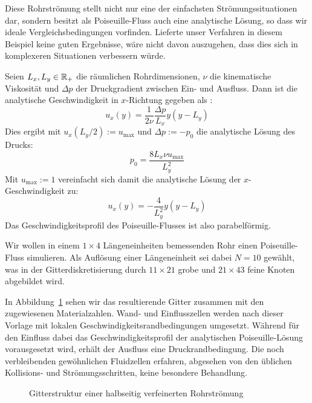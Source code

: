 Diese Rohrströmung stellt nicht nur eine der einfachsten Strömungssituationen dar, sondern besitzt als Poiseuille-Fluss auch eine analytische Lösung, so dass wir ideale Vergleichsbedingungen vorfinden. Lieferte unser Verfahren in diesem Beispiel keine guten Ergebnisse, wäre nicht davon auszugehen, dass dies sich in komplexeren Situationen verbessern würde.

\begin{Definition}
\label{def:analyticPoiseuille}
Seien \(L_x, L_y \in \mathbb{R}_+\) die räumlichen Rohrdimensionen, \(\nu\) die kinematische Viskosität und \(\Delta p\) der Druckgradient zwischen Ein- und Ausfluss. Dann ist die analytische Geschwindigkeit in \(x\)-Richtung gegeben als \cite[vgl.~Kap.~4]{bao11}:
\[u_x(y) = \frac{1}{2\nu} \frac{\Delta p}{L_x} y (y-L_y)\]
Dies ergibt mit \(u_x(L_y/2):=u_\text{max}\) und \(\Delta p := -p_0\) die analytische Lösung des Drucks:
\[p_0 = \frac{8 L_x \nu u_\text{max} }{L_y^2}\]
Mit \(u_\text{max}:=1\) vereinfacht sich damit die analytische Lösung der \(x\)-Geschwindigkeit zu:
\[u_x(y) = -\frac{4}{L_y^2} y (y-L_y)\]
Das Geschwindigkeitsprofil des Poiseuille-Flusses ist also parabelförmig.
\end{Definition}

Wir wollen in einem \(1 \times 4\) Längeneinheiten bemessenden Rohr einen Poiseuille-Fluss simulieren. Als Auflösung einer Längeneinheit sei dabei \(N=10\) gewählt, was in der Gitterdiskretisierung durch \(11 \times 21\) grobe und \(21 \times 43\) feine Knoten abgebildet wird.

In Abbildung~\ref{fig:PoiseuilleGridSetup} sehen wir das resultierende Gitter zusammen mit den zugewiesenen Materialzahlen. Wand- und Einflusszellen werden nach dieser Vorlage mit lokalen Geschwindigkeitsrandbedingungen umgesetzt. Während für den Einfluss dabei das Geschwindigkeitsprofil der analytischen Poiseuille-Lösung vorausgesetzt wird, erhält der Ausfluss eine Druckrandbedingung. Die noch verbleibenden gewöhnlichen Fluidzellen erfahren, abgesehen von den üblichen Kollisions- und Strömungsschritten, keine besondere Behandlung.

\begin{figure}[H]
\begin{adjustbox}{center}

\end{adjustbox}
\caption{Gitterstruktur einer halbseitig verfeinerten Rohrströmung}
\label{fig:PoiseuilleGridSetup}
\end{figure}

